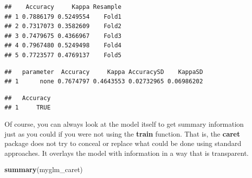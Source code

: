 \documentclass[]{book}
\newenvironment{Shaded}{\begin{snugshade}}{\end{snugshade}}
\newcommand{\KeywordTok}[1]{\textcolor[rgb]{0.13,0.29,0.53}{\textbf{#1}}}
\newcommand{\DecValTok}[1]{\textcolor[rgb]{0.00,0.00,0.81}{#1}}
\newcommand{\StringTok}[1]{\textcolor[rgb]{0.31,0.60,0.02}{#1}}
\newcommand{\CommentTok}[1]{\textcolor[rgb]{0.56,0.35,0.01}{\textit{#1}}}
\newcommand{\OperatorTok}[1]{\textcolor[rgb]{0.81,0.36,0.00}{\textbf{#1}}}
\newcommand{\NormalTok}[1]{#1}
\begin{document}
\begin{Shaded}
\end{Shaded}

\begin{verbatim}
##    Accuracy     Kappa Resample
## 1 0.7886179 0.5249554    Fold1
## 2 0.7317073 0.3582609    Fold2
## 3 0.7479675 0.4366967    Fold3
## 4 0.7967480 0.5249498    Fold4
## 5 0.7723577 0.4769137    Fold5
\end{verbatim}

\begin{Shaded}
\end{Shaded}

\begin{verbatim}
##   parameter  Accuracy     Kappa AccuracySD    KappaSD
## 1      none 0.7674797 0.4643553 0.02732965 0.06986202
\end{verbatim}

\begin{Shaded}
\end{Shaded}

\begin{verbatim}
##   Accuracy
## 1     TRUE
\end{verbatim}

Of course, you can always look at the model itself to get summary
information just as you could if you were not using the \textbf{train}
function. That is, the \textbf{caret} package does not try to conceal or
replace what could be done using standard approaches. It overlays the
model with information in a way that is transparent.

\begin{Shaded}
\begin{Highlighting}[]
\KeywordTok{summary}\NormalTok{(myglm_caret)}
\end{Highlighting}
\end{Shaded}
\end{document}

